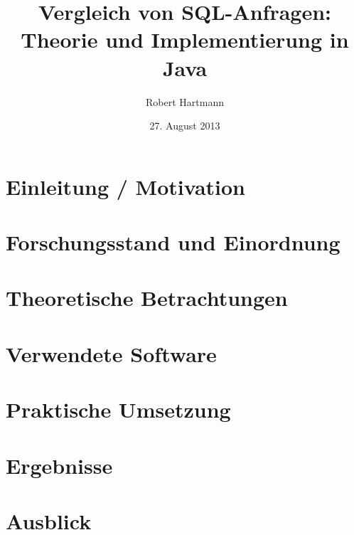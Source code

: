 \documentclass[12pt]{scrreprt}
\author{Robert Hartmann}
\title{Vergleich von SQL-Anfragen: Theorie und Implementierung in Java}
\date{27. August 2013}
\theoremstyle{remark}
\begin{document}

%

\pagestyle{plain}
\tableofcontents

\onehalfspacing

\chapter{Einleitung / Motivation}
\label{chap:introduction}


\chapter{Forschungsstand und Einordnung}
\label{chap:forschung}


\chapter{Theoretische Betrachtungen}
\label{chap:theorie}


\chapter{Verwendete Software}
\label{chap:software}


\chapter{Praktische Umsetzung}
\label{chap:praxis}


\chapter{Ergebnisse}


\chapter{Ausblick}
\label{chap:ausblick}

\end{document}
